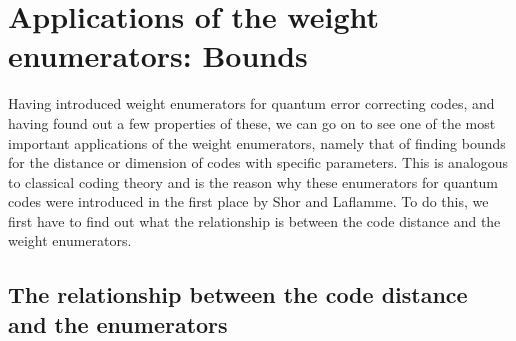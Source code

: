 \documentclass{article}
\theoremstyle{definition}
\begin{document}
\clearpage
\section{Applications of the weight enumerators: Bounds}

Having introduced weight enumerators for quantum error correcting codes, and having found out a few properties of these, we can go on to see one of the most important applications of the weight enumerators, namely that of finding bounds for the distance or dimension of codes with specific parameters.
This is analogous to classical coding theory and is the reason why these enumerators for quantum codes were introduced in the first place by Shor and Laflamme. To do this, we first have to find out what the relationship is between the code distance and the weight enumerators.


\subsection{The relationship between the code distance and the enumerators}
\end{document}
